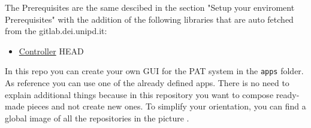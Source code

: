 The Prerequisites are the same descibed in the section "Setup your enviroment Prerequisites"  with the addition of the following libraries that are auto fetched from the gitlab.dei.unipd.it:

\begin{itemize}
  \tightlist
  \item
        \href{https://gitlab.dei.unipd.it/PAT/Controller.git}{Controller}
        HEAD
\end{itemize}


In this repo you can create your own GUI for the PAT system in the
\texttt{apps} folder. As reference you can use one of the already
defined apps. There is no need to explain additional things because in
this repository you want to compose ready-made pieces and not create new
ones. To simplify your orientation, you can find a global image of all the repositories in the picture .

